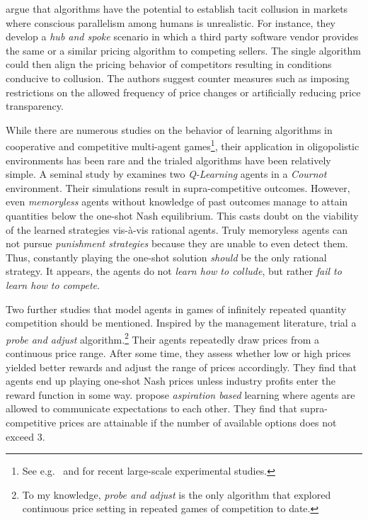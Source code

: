 \textcite[pp.6-17]{ezrachi_algorithmic_2017} argue that algorithms have the potential to establish tacit collusion in markets where conscious parallelism among humans is unrealistic. For instance, they develop a \emph{hub and spoke} scenario in which a third party software vendor provides the same or a similar pricing algorithm to competing sellers. The single algorithm could then align the pricing behavior of competitors resulting in conditions conducive to collusion. The authors suggest counter measures such as imposing restrictions on the allowed frequency of price changes or artificially reducing price transparency.


While there are numerous studies on the behavior of learning algorithms in cooperative and competitive multi-agent games\footnote{See e.g.\ \textcite{leibo_multi-agent_2017} and \textcite{crandall_cooperating_2018} for recent large-scale experimental studies.}, their application in oligopolistic environments has been rare and the trialed algorithms have been relatively simple. A seminal study by \textcite{waltman_q-learning_2008} examines two \emph{Q-Learning} agents in a \emph{Cournot} environment. Their simulations result in supra-competitive outcomes. However, even \emph{memoryless} agents without knowledge of past outcomes manage to attain quantities below the one-shot Nash equilibrium. This casts doubt on the viability of the learned strategies vis-à-vis rational agents. Truly memoryless agents can not pursue \emph{punishment strategies} because they are unable to even detect them. Thus, constantly playing the one-shot solution \emph{should} be the only rational strategy. It appears, the agents do not \emph{learn how to collude}, but rather \emph{fail to learn how to compete}.

Two further studies that model agents in games of infinitely repeated quantity competition should be mentioned. Inspired by the management literature, \textcite{kimbrough_learning_2009} trial a \emph{probe and adjust} algorithm.\footnote{To my knowledge, \emph{probe and adjust} is the only algorithm that explored continuous price setting in repeated games of competition to date.} Their agents repeatedly draw prices from a continuous price range. After some time, they assess whether low or high prices yielded better rewards and adjust the range of prices accordingly. They find that agents end up playing one-shot Nash prices unless industry profits enter the reward function in some way. \textcite{siallagan_aspiration-based_2013} propose \emph{aspiration based} learning where agents are allowed to communicate expectations to each other. They find that supra-competitive prices are attainable if the number of available options does not exceed 3.

